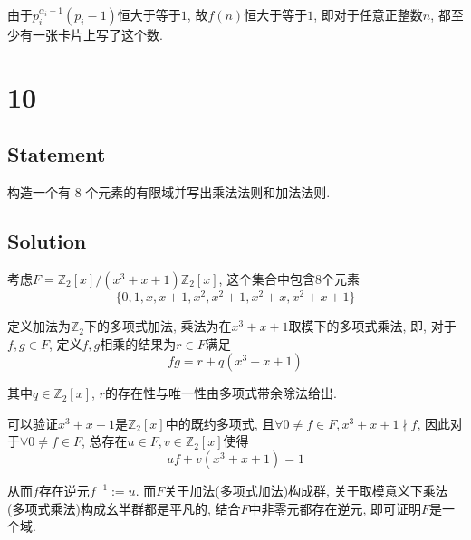 \documentclass[UTF-8]{ctexart}
\begin{document}
由于$p_i^{\alpha_i - 1}(p_i - 1)$恒大于等于$1$, 故$f(n)$恒大于等于$1$, 即对于任意正整数$n$, 都至少有一张卡片上写了这个数.
\section*{10}
\subsection*{Statement}
构造一个有 $8$ 个元素的有限域并写出乘法法则和加法法则.
\subsection*{Solution}

考虑$F = \mathbb Z_2[x] / (x^3 + x + 1)\mathbb Z_2[x]$, 这个集合中包含$8$个元素
$$\{0, 1, x, x + 1, x^2, x^2 + 1, x^2 + x, x^2 + x + 1\}$$

定义加法为$\mathbb Z_2$下的多项式加法, 乘法为在$x^3 + x + 1$取模下的多项式乘法, 即, 对于$f, g \in F$, 定义$f, g$相乘的结果为$r \in F$满足
$$fg = r + q(x^3 + x + 1)$$

其中$q \in \mathbb Z_2[x]$, $r$的存在性与唯一性由多项式带余除法给出.

可以验证$x^3 + x + 1$是$\mathbb Z_2[x]$中的既约多项式, 且$\forall 0 \neq f \in F, x^3 + x + 1 \nmid f$, 因此对于$\forall 0 \neq f \in F$, 总存在$u \in F, v \in \mathbb Z_2[x]$使得$$uf + v(x^3 + x + 1) = 1$$

从而$f$存在逆元$f^{-1} := u$. 而$F$关于加法(多项式加法)构成群, 关于取模意义下乘法(多项式乘法)构成幺半群都是平凡的, 结合$F$中非零元都存在逆元, 即可证明$F$是一个域.
	
\end{document}
